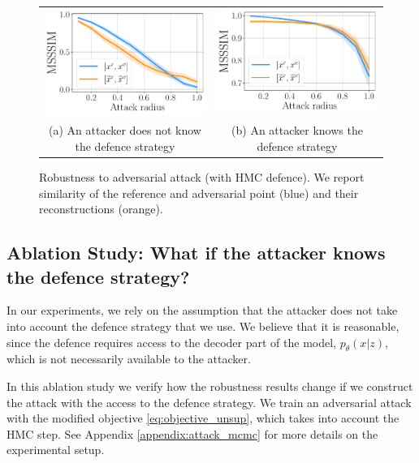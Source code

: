 {%
\begin{figure}[t]
    \centering
    \begin{tabular}{cc}
     \includegraphics[width=0.4\linewidth]{pics/3_adv_att/attack_mcmc_0_100.pdf} &
     \includegraphics[width=0.4\linewidth]{pics/3_adv_att/attack_mcmc_1_100.pdf} \\
     \multirow{2}{0.45\linewidth}{\centering \small (a) An attacker does not know the defence strategy}&
     \multirow{2}{0.45\linewidth}{\centering \small (b) An attacker knows the defence strategy }\\
     \\
    \end{tabular}
    \caption{Robustness to adversarial attack (with HMC defence). We report similarity of the reference and adversarial point (blue) and their reconstructions (orange).}
    \label{fig:attack_mcmc}
	\vspace*{\baselineskip}
\end{figure}



\subsection{Ablation Study: What if the attacker knows the defence strategy?} \label{sec:ablation}
In our experiments, we rely on the assumption that the attacker does not take into account the defence strategy that we use. We believe that it is reasonable, since the defence requires access to the decoder part of the model, $p_{\theta}(x|z)$, which is not necessarily available to the attacker. 

In this ablation study we verify how the robustness results change if we construct the attack with the access to the defence strategy. We train an adversarial attack with the modified objective \ref{eq:objective_unsup}, which takes into account the HMC step. See Appendix \ref{appendix:attack_mcmc} for more details on the experimental setup. 

}
